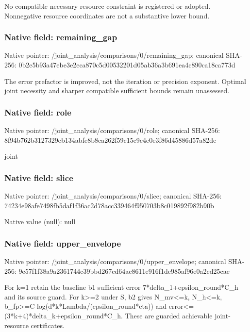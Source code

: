 \documentclass[10pt,a4paper]{article}
\begin{document}
\begingroup\raggedright\sloppy No compatible necessary resource constraint is registered or adopted. Nonnegative resource coordinates are not a substantive lower bound.\par\endgroup

\subsubsection{Native field: remaining\_\allowbreak{}gap}
Native pointer: /joint\_\allowbreak{}analysis/comparisons/0/remaining\_\allowbreak{}gap; canonical SHA-256: 0b2e5b93a47ebe3e2eca870c5d00532201d05ab36a3b691ea4c890ca18ca773d

\begingroup\raggedright\sloppy The error prefactor is improved,\allowbreak{} not the iteration or precision exponent. Optimal joint necessity and sharper compatible sufficient bounds remain unassessed.\par\endgroup

\subsubsection{Native field: role}
Native pointer: /joint\_\allowbreak{}analysis/comparisons/0/role; canonical SHA-256: 8f94b762b3127329eb134abfe8b8ca262f59c15e9c4e0e3f86d45886d57a82de

\begingroup\raggedright\sloppy joint\par\endgroup

\subsubsection{Native field: slice}
Native pointer: /joint\_\allowbreak{}analysis/comparisons/0/slice; canonical SHA-256: 74234e98afe7498fb5daf1f36ac2d78acc339464f950703b8c019892f982b90b

Native value (null): null

\subsubsection{Native field: upper\_\allowbreak{}envelope}
Native pointer: /joint\_\allowbreak{}analysis/comparisons/0/upper\_\allowbreak{}envelope; canonical SHA-256: 9e57f1f38a9a2361744c39bbd267cd64ac8611e916f1dc985af96e0a2cd25cae

\begingroup\raggedright\sloppy For k=\allowbreak{}1 retain the baseline b1 sufficient error 7*delta\_\allowbreak{}1+epsilon\_\allowbreak{}round*C\_\allowbreak{}h and its source guard. For k>=\allowbreak{}2 under S,\allowbreak{} b2 gives N\_\allowbreak{}mv<=\allowbreak{}k,\allowbreak{} N\_\allowbreak{}h<=\allowbreak{}k,\allowbreak{} b\_\allowbreak{}fp>=\allowbreak{}C log(d*k*Lambda/\allowbreak{}(epsilon\_\allowbreak{}round*eta)) and error<=\allowbreak{}(3*k+4)*delta\_\allowbreak{}k+epsilon\_\allowbreak{}round*C\_\allowbreak{}h. These are guarded achievable joint-resource certificates.\par\endgroup
\end{document}
